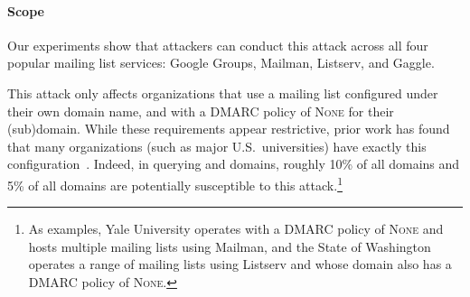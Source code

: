 \paragraph{Scope}
Our experiments show that attackers can
conduct this attack across all four popular mailing list services: Google
Groups, Mailman, Listserv, and Gaggle.

This attack only affects organizations that use a mailing list configured under their own domain name, and with a DMARC policy of \textsc{None} for their (sub)domain.
While these requirements appear restrictive, prior
work has found that many organizations
(such as major U.S.\ universities) have exactly this configuration~\cite{hutowardsunderstanding}.
Indeed, in querying  and
 domains, roughly 10\% of all 
domains and 5\% of all  domains are potentially susceptible to this attack.\footnote{As examples, Yale University operates  with a DMARC policy of \textsc{None} and hosts multiple mailing lists using Mailman, and the State of Washington operates a range of mailing lists using Listserv and whose  domain also has a DMARC policy of \textsc{None}.}




